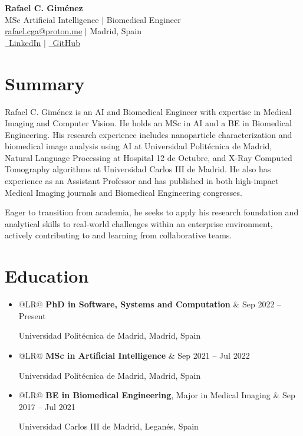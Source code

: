 \documentclass[letterpaper,10pt]{article}
\makeatletter
\newcommand{\dateitem}[2]{
    \item
    \noindent
    \begin{tabularx}{\linewidth}{@{}LR@{}}
        #1 & #2 \\
    \end{tabularx}
    \par
}
\makeatother
\begin{document}
\begin{center}
    \vspace{-1cm} %
    \color{headerblue}
    {\Huge \bfseries Rafael C. Giménez} \\
    \vspace{5pt}
    \normalsize
    MSc Artificial Intelligence $|$ Biomedical Engineer \\
    \vspace{5pt}
    \color{textgray}
    \href{mailto:rafael.cga@proton.me}{rafael.cga@proton.me} $|$ Madrid, Spain \\
    \vspace{3pt}
    \href{https://www.linkedin.com/in/rafaelcga/}{\faLinkedin\ LinkedIn} $|$ \href{https://github.com/rafaelcga}{\faGithub\ GitHub} \\
\end{center}
\vspace{5pt} %

\section*{Summary}
\vspace{5pt}
\color{textgray}
Rafael C. Giménez is an AI and Biomedical Engineer with expertise in Medical Imaging and Computer Vision. He holds an MSc in AI and a BE in Biomedical Engineering. His research experience includes nanoparticle characterization and biomedical image analysis using AI at Universidad Politécnica de Madrid, Natural Language Processing at Hospital 12 de Octubre, and X-Ray Computed Tomography algorithms at Universidad Carlos III de Madrid. He also has experience as an Assistant Professor and has published in both high-impact Medical Imaging journals and Biomedical Engineering congresses.

Eager to transition from academia, he seeks to apply his research foundation and analytical skills to real-world challenges within an enterprise environment, actively contributing to and learning from collaborative teams.

\section*{Education}
\vspace{5pt}
\color{textgray}
\begin{itemize}
    \dateitem{\textbf{PhD in Software, Systems and Computation}}{Sep 2022 -- Present}
        Universidad Politécnica de Madrid, Madrid, Spain
    \dateitem{\textbf{MSc in Artificial Intelligence}}{Sep 2021 -- Jul 2022}
        Universidad Politécnica de Madrid, Madrid, Spain
    \dateitem{\textbf{BE in Biomedical Engineering}, Major in Medical Imaging}{Sep 2017 -- Jul 2021}
        Universidad Carlos III de Madrid, Leganés, Spain
\end{itemize}
\end{document}
